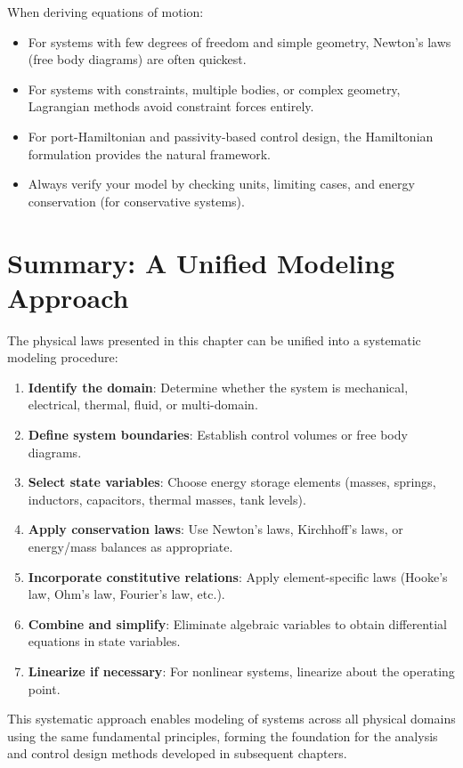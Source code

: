 \begin{practicalbox}
When deriving equations of motion:
\begin{itemize}
    \item For systems with few degrees of freedom and simple geometry, Newton's laws (free body diagrams) are often quickest.
    \item For systems with constraints, multiple bodies, or complex geometry, Lagrangian methods avoid constraint forces entirely.
    \item For port-Hamiltonian and passivity-based control design, the Hamiltonian formulation provides the natural framework.
    \item Always verify your model by checking units, limiting cases, and energy conservation (for conservative systems).
\end{itemize}
\end{practicalbox}

\section{Summary: A Unified Modeling Approach}
\label{sec:unified_approach}

The physical laws presented in this chapter can be unified into a systematic modeling procedure:

\begin{enumerate}
    \item \textbf{Identify the domain}: Determine whether the system is mechanical, electrical, thermal, fluid, or multi-domain.
    \item \textbf{Define system boundaries}: Establish control volumes or free body diagrams.
    \item \textbf{Select state variables}: Choose energy storage elements (masses, springs, inductors, capacitors, thermal masses, tank levels).
    \item \textbf{Apply conservation laws}: Use Newton's laws, Kirchhoff's laws, or energy/mass balances as appropriate.
    \item \textbf{Incorporate constitutive relations}: Apply element-specific laws (Hooke's law, Ohm's law, Fourier's law, etc.).
    \item \textbf{Combine and simplify}: Eliminate algebraic variables to obtain differential equations in state variables.
    \item \textbf{Linearize if necessary}: For nonlinear systems, linearize about the operating point.
\end{enumerate}

This systematic approach enables modeling of systems across all physical domains using the same fundamental principles, forming the foundation for the analysis and control design methods developed in subsequent chapters.

